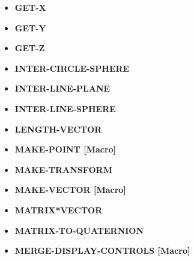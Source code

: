 \documentclass [11pt]{book}
\begin{document}
\begin{itemize}
\item {}
\textbf{GET-X}





\item {}
\textbf{GET-Y}





\item {}
\textbf{GET-Z}





\item {}
\textbf{INTER-CIRCLE-SPHERE}





\item {}
\textbf{INTER-LINE-PLANE}





\item {}
\textbf{INTER-LINE-SPHERE}





\item {}
\textbf{LENGTH-VECTOR}





\item {}
\textbf{MAKE-POINT [Macro]}





\item {}
\textbf{MAKE-TRANSFORM}





\item {}
\textbf{MAKE-VECTOR [Macro]}





\item {}
\textbf{MATRIX*VECTOR}





\item {}
\textbf{MATRIX-TO-QUATERNION}





\item {}
\textbf{MERGE-DISPLAY-CONTROLS [Macro]}






\end{itemize}
\end{document}
